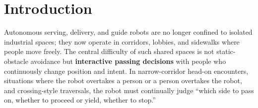\documentclass[11pt]{article}
\begin{document}
\begin{abstract}
hardening is the only tested mechanism that holds a nearly complete maneuver against a late scripted burst of 30 cycles or longer. Closed-loop evaluation, comparison with the published planners and opinion-dynamics passing, and user studies are not performed; they are specified as a planned-evaluation protocol (\S5.6). Code: \url{https://github.com/kjungmo/compass}.

\medskip
\noindent\textbf{Keywords:} social navigation, topological path planning, temporal consistency, human-robot interaction, ROS2
\end{abstract}

\section{Introduction}

Autonomous serving, delivery, and guide robots are no longer confined to isolated industrial spaces; they now operate in corridors, lobbies, and sidewalks where people move freely. The central difficulty of such shared spaces is not static-obstacle avoidance but \textbf{interactive passing decisions} with people who continuously change position and intent. In narrow-corridor head-on encounters, situations where the robot overtakes a person or a person overtakes the robot, and crossing-style traversals, the robot must continually judge ``which side to pass on, whether to proceed or yield, whether to stop.''
\end{document}
